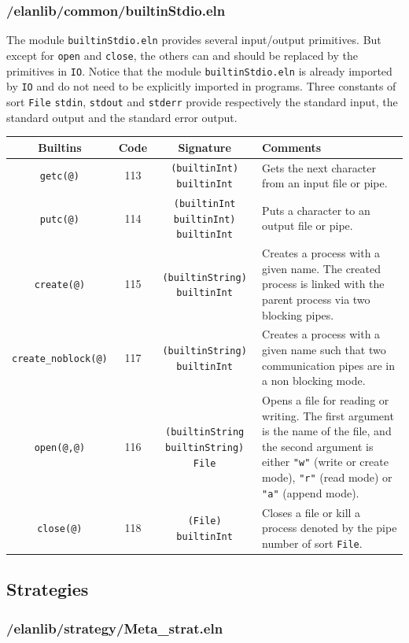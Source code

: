 \subsubsection{/elanlib/common/builtinStdio.eln}
The module {\tt builtinStdio.eln} provides several input/output primitives.
But except for {\tt open} and {\tt close}, the others can and should be replaced by the primitives in {\tt IO}.
Notice that the module {\tt builtinStdio.eln} is already imported by {\tt IO} and do not need to be explicitly imported in {\elan} programs.
Three constants of sort {\tt File} {\tt stdin}, {\tt stdout} and {\tt stderr} provide respectively the standard input, the standard output and the standard error output.

\begin{tabular}{|c|c|c|p{}|}
\hline
{\bf Builtins} & {\bf Code} & {\bf Signature} & {\bf Comments} \\
\hline
\hline
{\tt getc(@)}             & 113 & {\tt (builtinInt) builtinInt} & Gets the next character from an input file or pipe.\\
{\tt putc(@)}             & 114 & {\tt (builtinInt builtinInt) builtinInt}  & Puts a character to an output file or pipe.\\
{\tt create(@)}           & 115 & {\tt (builtinString) builtinInt} & Creates a process with a given name. The created process is linked with the parent process via two blocking pipes.\\
{\tt create\_noblock(@)}  & 117 & {\tt (builtinString) builtinInt} & Creates a process with a given name such that two communication pipes are in a non blocking mode.\\
{\tt open(@,@)}           & 116 & {\tt (builtinString builtinString) File} & Opens a file for reading or writing. The first argument is the name of the file, and the second argument is either {\tt "w"} (write or create mode), {\tt "r"} (read mode) or {\tt "a"} (append mode).\\
{\tt close(@)}            & 118 & {\tt (File) builtinInt} & Closes a file or kill a process denoted by the pipe number of sort {\tt File}.\\
\hline
\end{tabular}


\subsection{Strategies}

\subsubsection{/elanlib/strategy/Meta\_strat.eln}

